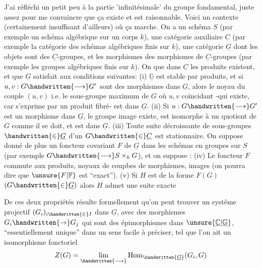J'ai réfléchi un petit peu à la partie 'infinitésimale' du groupe fondamental, juste assez pour me convaincre que ça existe et est raisonnable. Voici un contexte (certainement insuffisant d'ailleurs) où ça marche. On a un schéma $S$ (par exemple un schéma algébrique sur un corps $k$), une catégorie auxiliaire $\underline{C}$ (par exemple la catégorie des schémas algébriques finis sur $k$), une catégorie  $\underline{G}$ dont les objets sont des $\underline{C}$-groupes, et les morphismes des morphismes de $\underline{C}$-groupes (par exemple les groupes algébriques finis sur $k$). On  que dans $\underline{C}$ les produits  existent, et que $\underline{G}$ satisfait aux conditions suivantes: (i) $\underline{\mathbb{G}}$ est stable par produits, et si $u,v:G\handwritten{\longrightarrow}G'$ sont des morphismes dans $\underline{G}$, alors le noyau du couple $(u,v)$ i.e. le sous-groupe  maximum de $G$ où $u,v$ coïncidant -qui existe, car s'exprime par un produit fibré- est dans $\underline{G}$. (ii) Si $u:G\handwritten{\longrightarrow}G'$ est un morphisme dans $\underline{G}$,  le groupe image existe, est isomorphe à un quotient de $G$ comme il se doit, et est dans $\underline{G}$. (iii) Toute suite décroissante de sous-groupes  $\handwritten{\in}\underline{G}$ d'un $G\handwritten{\in}\underline{C}$ est stationnaire. On suppose donné de plus un foncteur covariant  $F$ de $\underline{G}$ dans les  schémas en groupes sur $S$ (par exemple $G\handwritten{\longrightarrow}S\mathbin{\times}_{k}G$), et on suppose : (iv) Le foncteur $F$ commute aux produits,  noyaux de coupbes de morphismes, images (on pourra dire que $\unsure{F|\mathbb{F}}$ est ``exact''). (v) Si $H$ est  de la forme $F(G)$ $(G\handwritten{\in}\underline{G})$ alors $H$ admet une suite exacte


De ces deux propriétés résulte formellement qu'on peut trouver un systême projectif  $(G_i)_{i\handwritten{\in}I}$ dans $\underline{G}$, avec des morphismes $G_i\handwritten{\to}G_j$ qui sont des épimorphismes dans $\unsure{\underline{\mathbb{C}}|\underline{\mathbb{G}}}$, ``essentiellement unique'' dans un sens facile à préciser, tel que  l'on ait un isomorphisme fonctoriel
\[
Z(G)=\underset{\handwritten{\longrightarrow}}{\lim}\operatorname{Hom}_{\handwritten{\underline{G}}}(G_i,G)
\]


